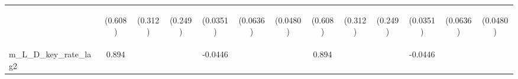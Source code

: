 \documentclass[]{article}
\begin{document}
\begin{center}
\begin{tabular}{lcccccccccccc}
\vspace{4pt} & \begin{footnotesize}(0.608)\end{footnotesize} & \begin{footnotesize}(0.312)\end{footnotesize} & \begin{footnotesize}(0.249)\end{footnotesize} & \begin{footnotesize}(0.0351)\end{footnotesize} & \begin{footnotesize}(0.0636)\end{footnotesize} & \begin{footnotesize}(0.0480)\end{footnotesize} & \begin{footnotesize}(0.608)\end{footnotesize} & \begin{footnotesize}(0.312)\end{footnotesize} & \begin{footnotesize}(0.249)\end{footnotesize} & \begin{footnotesize}(0.0351)\end{footnotesize} & \begin{footnotesize}(0.0636)\end{footnotesize} & \begin{footnotesize}(0.0480)\end{footnotesize} \\
m\_L\_D\_key\_rate\_lag2 & 0.894 &  &  & -0.0446 &  &  & 0.894 &  &  & -0.0446 &  &  \\

\end{tabular}
\end{center}
\end{document}

